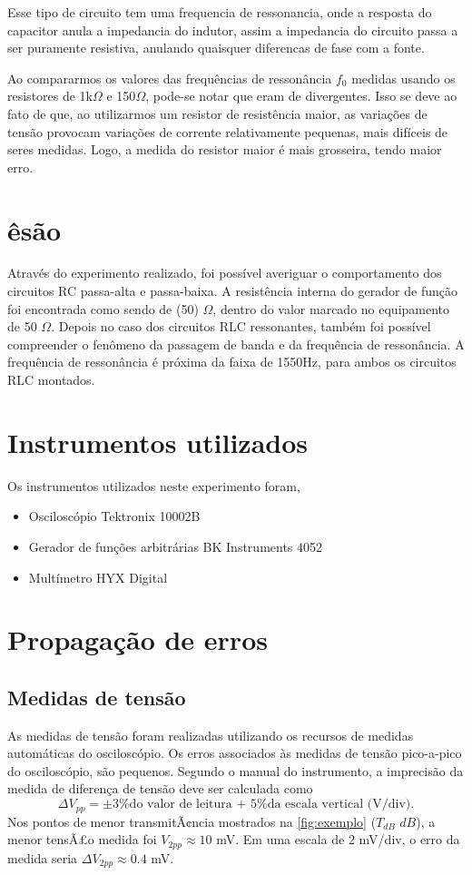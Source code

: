 \documentclass[11pt,a4paper]{article}
\begin{document}
Esse tipo de circuito tem uma frequencia de ressonancia, onde a resposta do capacitor anula a impedancia do indutor, assim a impedancia do circuito passa a ser puramente resistiva, anulando quaisquer diferencas de fase com a fonte.

Ao compararmos os valores das frequências de ressonância $f_0$ medidas usando os resistores de 1k$\Omega$ e 150$\Omega$, pode-se notar que eram de divergentes. Isso se deve ao fato de que, ao utilizarmos um resistor de resistência maior, as variações de tensão provocam variações de corrente relativamente pequenas, mais difíceis de seres medidas. Logo, a medida do resistor maior é mais grosseira, tendo maior erro.
\\
\section{êsão}

Através do experimento realizado, foi possível averiguar o comportamento dos circuitos RC passa-alta e passa-baixa. A resistência interna do gerador de função foi encontrada como sendo  de (50) $\Omega$, dentro do  valor marcado no equipamento de 50 $\Omega$. Depois no caso dos circuitos RLC ressonantes, também foi possível compreender o fenômeno da passagem de banda e da frequência de ressonância. A frequência de ressonância é próxima da faixa de 1550Hz, para ambos os circuitos RLC montados. 

\section{Instrumentos utilizados}
Os instrumentos utilizados neste experimento foram,
\begin{itemize}
	\item Osciloscópio Tektronix 10002B
	\item Gerador de funções arbitrárias BK Instruments 4052
	\item Multímetro HYX Digital
\end{itemize}

\section{Propagação de erros \label{ap:erros}}
\subsection{Medidas de tensão}
As medidas de tensão foram realizadas utilizando os recursos de medidas automáticas do osciloscópio. Os erros associados às medidas de tensão pico-a-pico do osciloscópio, são pequenos. Segundo o manual do instrumento, a imprecisão da medida de diferença de tensão deve ser calculada como 
\begin{equation}
\Delta V_{pp}=\pm 3\%\text{do valor de leitura + 5\% da escala vertical (V/div)} .
\end{equation}
Nos pontos de menor transmitÃ¢ncia mostrados na \cref{fig:exemplo} ($T_{dB}$ $ dB$), a menor tensÃ£o medida foi $V_{2pp}\approx 10$ mV. Em uma escala de 2 mV/div, o erro da medida seria $\Delta V_{2pp}\approx 0.4$ mV.
\end{document}
